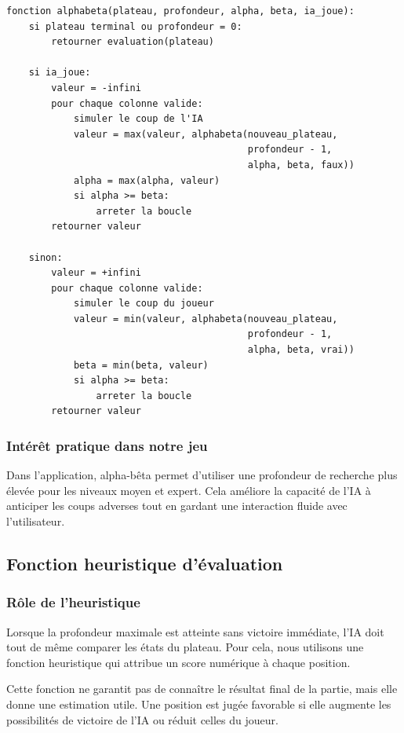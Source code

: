 \documentclass[12pt,a4paper]{article}
\begin{document}
\begin{lstlisting}[style=pythonstyle, caption={Pseudo-code de Min-Max avec élagage alpha-bêta}]
fonction alphabeta(plateau, profondeur, alpha, beta, ia_joue):
    si plateau terminal ou profondeur = 0:
        retourner evaluation(plateau)

    si ia_joue:
        valeur = -infini
        pour chaque colonne valide:
            simuler le coup de l'IA
            valeur = max(valeur, alphabeta(nouveau_plateau,
                                           profondeur - 1,
                                           alpha, beta, faux))
            alpha = max(alpha, valeur)
            si alpha >= beta:
                arreter la boucle
        retourner valeur

    sinon:
        valeur = +infini
        pour chaque colonne valide:
            simuler le coup du joueur
            valeur = min(valeur, alphabeta(nouveau_plateau,
                                           profondeur - 1,
                                           alpha, beta, vrai))
            beta = min(beta, valeur)
            si alpha >= beta:
                arreter la boucle
        retourner valeur
\end{lstlisting}

\subsubsection{Intérêt pratique dans notre jeu}

Dans l'application, alpha-bêta permet d'utiliser une profondeur de recherche plus élevée pour les niveaux moyen et expert. Cela améliore la capacité de l'IA à anticiper les coups adverses tout en gardant une interaction fluide avec l'utilisateur.


\subsection{Fonction heuristique d'évaluation}

\subsubsection{Rôle de l'heuristique}

Lorsque la profondeur maximale est atteinte sans victoire immédiate, l'IA doit tout de même comparer les états du plateau. Pour cela, nous utilisons une fonction heuristique qui attribue un score numérique à chaque position.

Cette fonction ne garantit pas de connaître le résultat final de la partie, mais elle donne une estimation utile. Une position est jugée favorable si elle augmente les possibilités de victoire de l'IA ou réduit celles du joueur.
\end{document}

